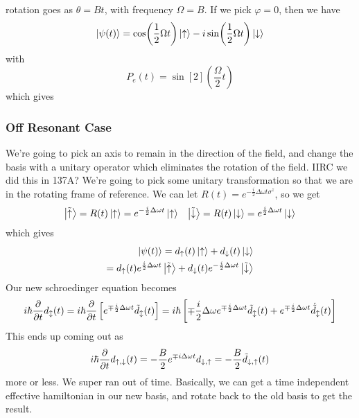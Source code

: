 \documentclass{article}
\theoremstyle{definition}
\begin{document}
rotation goes as $\theta=Bt$, with frequency $\Omega=B$. If we pick $\varphi=0$, then we have \begin{equation} \ket{\psi(t)}=\cos(\frac{1}{2}\Omega t)\ket{\uparrow}-i\sin(\frac{1}{2}\Omega t)\ket{\downarrow} \end{equation} with \begin{equation} P_e(t)=\sin[2](\frac{\Omega}{2}t) \end{equation} which gives \begin{center}  \end{center} \subsubsection{Off Resonant Case} We're going to pick an axis to remain in the direction of the field, and change the basis with a unitary operator which eliminates the rotation of the field. IIRC we did this in 137A? We're going to pick some unitary transformation so that we are in the rotating frame of reference. We can let $R(t)=e^{-\frac{i}{2}\Delta\omega t\sigma^z}$, so we get \begin{align} \ket{\tilde\uparrow}=R(t)\ket{\uparrow}=e^{-\frac{i}{2}\Delta\omega t}\ket{\uparrow} && \ket{\tilde\downarrow}=R(t)\ket{\downarrow}=e^{\frac{i}{2}\Delta\omega t}\ket{\downarrow} \end{align} which gives \begin{align} \ket{\psi(t)}=d_\uparrow(t)\ket{\uparrow}+d_\downarrow(t)\ket{\downarrow} \\ =d_\uparrow(t)e^{\frac{i}{2}\Delta\omega t}\ket{\tilde\uparrow}+d_\downarrow(t)e^{-\frac{i}{2}\Delta\omega t}\ket{\tilde\downarrow} \end{align} Our new schroedinger equation becomes \begin{align} i\hbar\pdv{t}d_{\updownarrow}(t)=i\hbar\pdv{t}\left[e^{\mp\frac{i}{2}\Delta\omega t}\tilde d_\updownarrow(t)\right] =i\hbar\left[ \mp\frac{i}{2}\Delta\omega e^{\mp\frac{i}{2}\Delta\omega t}\tilde d_\updownarrow(t)+ e^{\mp\frac{i}{2}\Delta\omega t}\dot{\tilde d}_\updownarrow(t) \right] \end{align} This ends up coming out as \begin{equation} i\hbar\pdv{t}d_{\uparrow,\downarrow}(t)=-\frac{B}{2}e^{\mp i\Delta\omega t}d_{\downarrow,\uparrow}=-\frac{B}{2}\tilde d_{\downarrow,\uparrow}(t) \end{equation} more or less. We super ran out of time. Basically, we can get a time independent effective hamiltonian in our new basis, and rotate back to the old basis to get the result.
\end{document}
